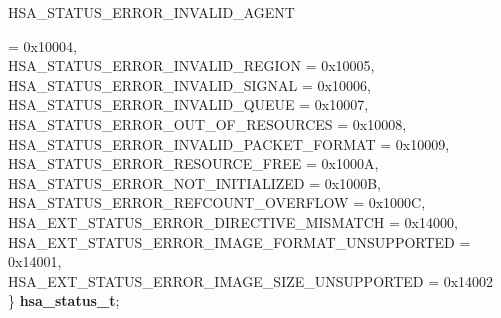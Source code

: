 \documentclass[final]{book}
\newcommand{\reftyp}[1]{#1}
\newcommand{\refenu}[1]{\reftyp{#1}}
\newenvironment{mylongtable}{\rowcolors{0}{lightgray}{lightgray}\longtable} {
\endlongtable}
\begin{document}
\begin{mylongtable}{@{}p{\textwidth}}
\hspace{1.7em}\hypertarget{group__status_1ggad755322e7ff95456520e8abdbe90d225a3a5d835c109c2d0ad5b9c2771e133e5d}{\refenu{HSA_\-STATUS_\-ERROR_\-INVALID_\-AGENT}} = 0x10004,\\
\hspace{1.7em}\hypertarget{group__status_1ggad755322e7ff95456520e8abdbe90d225ad63594ac02edec7ae7aa7722c11afcd9}{\refenu{HSA_\-STATUS_\-ERROR_\-INVALID_\-REGION}} = 0x10005,\\
\hspace{1.7em}\hypertarget{group__status_1ggad755322e7ff95456520e8abdbe90d225a7b4c8c0d4c99a1fe966abc2d39b575fe}{\refenu{HSA_\-STATUS_\-ERROR_\-INVALID_\-SIGNAL}} = 0x10006,\\
\hspace{1.7em}\hypertarget{group__status_1ggad755322e7ff95456520e8abdbe90d225aa3c762eb6a61b358702b45259d1686c4}{\refenu{HSA_\-STATUS_\-ERROR_\-INVALID_\-QUEUE}} = 0x10007,\\
\hspace{1.7em}\hypertarget{group__status_1ggad755322e7ff95456520e8abdbe90d225a1a77fcf36d0d140874c4361ab093eff7}{\refenu{HSA_\-STATUS_\-ERROR_\-OUT_\-OF_\-RESOURCES}} = 0x10008,\\
\hspace{1.7em}\hypertarget{group__status_1ggad755322e7ff95456520e8abdbe90d225a3fad45f72111eb99de5d8daef26c372c}{\refenu{HSA_\-STATUS_\-ERROR_\-INVALID_\-PACKET_\-FORMAT}} = 0x10009,\\
\hspace{1.7em}\hypertarget{group__status_1ggad755322e7ff95456520e8abdbe90d225a6406af88203fcbec4179fbb71cc66b65}{\refenu{HSA_\-STATUS_\-ERROR_\-RESOURCE_\-FREE}} = 0x1000A,\\
\hspace{1.7em}\hypertarget{group__status_1ggad755322e7ff95456520e8abdbe90d225a34ea59ade5bfce95eee935238a99f5b5}{\refenu{HSA_\-STATUS_\-ERROR_\-NOT_\-INITIALIZED}} = 0x1000B,\\
\hspace{1.7em}\hypertarget{group__status_1ggad755322e7ff95456520e8abdbe90d225aa9218eed04d1d2ffc5ed8f33f2cd1c9b}{\refenu{HSA_\-STATUS_\-ERROR_\-REFCOUNT_\-OVERFLOW}} = 0x1000C,\\
\hspace{1.7em}\hypertarget{group__status_1ggad755322e7ff95456520e8abdbe90d225ae16bcc443d027a0b880fd58f0443227b}{\refenu{HSA_\-EXT_\-STATUS_\-ERROR_\-DIRECTIVE_\-MISMATCH}} = 0x14000,\\
\hspace{1.7em}\hypertarget{group__status_1ggad755322e7ff95456520e8abdbe90d225a42108181943a2d94749d95dc7942b7d0}{\refenu{HSA_\-EXT_\-STATUS_\-ERROR_\-IMAGE_\-FORMAT_\-UNSUPPORTED}} = 0x14001,\\
\hspace{1.7em}\hypertarget{group__status_1ggad755322e7ff95456520e8abdbe90d225a3ff898da367040b1f382c14c9f0a1bab}{\refenu{HSA_\-EXT_\-STATUS_\-ERROR_\-IMAGE_\-SIZE_\-UNSUPPORTED}} = 0x14002\\
\} \hypertarget{group__status_1gad755322e7ff95456520e8abdbe90d225}{\textbf{hsa_\-status_\-t}};\rule[-2ex]{0pt}{0pt}\end{mylongtable}
\end{document}

